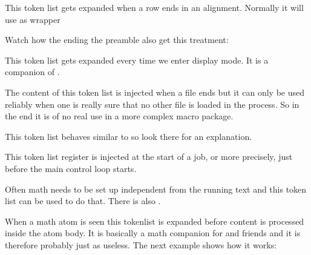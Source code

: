 \stopnewprimitive

\startoldprimitive[title={\prm {everycr}}]

This token list gets expanded when a row ends in an alignment. Normally it will
use  as wrapper

\startbuffer
{            }
{ \hsize 4cm }
\stopbuffer

\typebuffer

Watch how the  ending the preamble also get this treatment:

\getbuffer

\stopoldprimitive

\startoldprimitive[title={\prm {everydisplay}}]

This token list gets expanded every time we enter display mode. It is a companion
of .

\stopoldprimitive

\startoldprimitive[title={\prm {everyeof}}]

The content of this token list is injected when a file ends but it can only be
used reliably when one is really sure that no other file is loaded in the
process. So in the end it is of no real use in a more complex macro package.

\stopoldprimitive

\startoldprimitive[title={\prm {everyhbox}}]

This token list behaves similar to  so look there for an
explanation.

\stopoldprimitive

\startoldprimitive[title={\prm {everyjob}}]

This token list register is injected at the start of a job, or more precisely,
just before the main control loop starts.

\stopoldprimitive

\startoldprimitive[title={\prm {everymath}}]

Often math needs to be set up independent from the running text and this token
list can be used to do that. There is also .

\stopoldprimitive

\startnewprimitive[title={\prm {everymathatom}}]

When a math atom is seen this tokenlist is expanded before content is processed
inside the atom body. It is basically a math companion for  and
friends and it is therefore probably just as useless. The next example shows how
it works:


